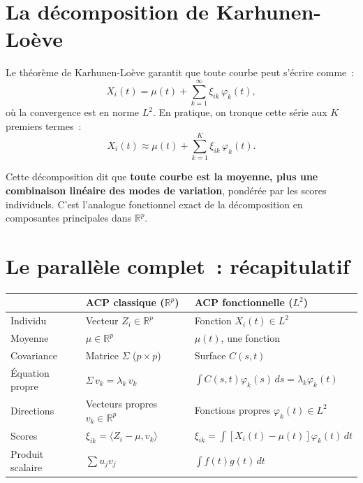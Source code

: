 \documentclass[11pt, a4paper]{article}
\newcommand{\R}{\mathbb{R}}
\begin{document}
\section{La d\'ecomposition de Karhunen-Lo\`eve}

Le th\'eor\`eme de Karhunen-Lo\`eve garantit que toute courbe peut s'\'ecrire comme~:
\[
    X_i(t) = \mu(t) + \sum_{k=1}^{\infty} \xi_{ik} \, \varphi_k(t),
\]
o\`u la convergence est en norme $L^2$. En pratique, on tronque cette s\'erie aux $K$ premiers termes~:
\[
    X_i(t) \approx \mu(t) + \sum_{k=1}^{K} \xi_{ik} \, \varphi_k(t).
\]

Cette d\'ecomposition dit que \textbf{toute courbe est la moyenne, plus une combinaison lin\'eaire des modes de variation}, pond\'er\'ee par les scores individuels. C'est l'analogue fonctionnel exact de la d\'ecomposition en composantes principales dans $\R^p$.

\section{Le parall\`ele complet~: r\'ecapitulatif}

\begin{center}
\begin{tabular}{lll}
    \hline
    & \textbf{ACP classique} ($\R^p$) & \textbf{ACP fonctionnelle} ($L^2$) \\
    \hline
    Individu & Vecteur $Z_i \in \R^p$ & Fonction $X_i(t) \in L^2$ \\
    Moyenne & $\mu \in \R^p$ & $\mu(t)$, une fonction \\
    Covariance & Matrice $\Sigma$ ($p \times p$) & Surface $C(s,t)$ \\
    \'Equation propre & $\Sigma \, v_k = \lambda_k \, v_k$ & $\int C(s,t) \varphi_k(s) \, ds = \lambda_k \varphi_k(t)$ \\
    Directions & Vecteurs propres $v_k \in \R^p$ & Fonctions propres $\varphi_k(t) \in L^2$ \\
    Scores & $\xi_{ik} = \langle Z_i - \mu, v_k \rangle$ & $\xi_{ik} = \int [X_i(t) - \mu(t)] \varphi_k(t) \, dt$ \\
    Produit scalaire & $\sum u_j v_j$ & $\int f(t) g(t) \, dt$ \\
    \hline
\end{tabular}
\end{center}
\end{document}
